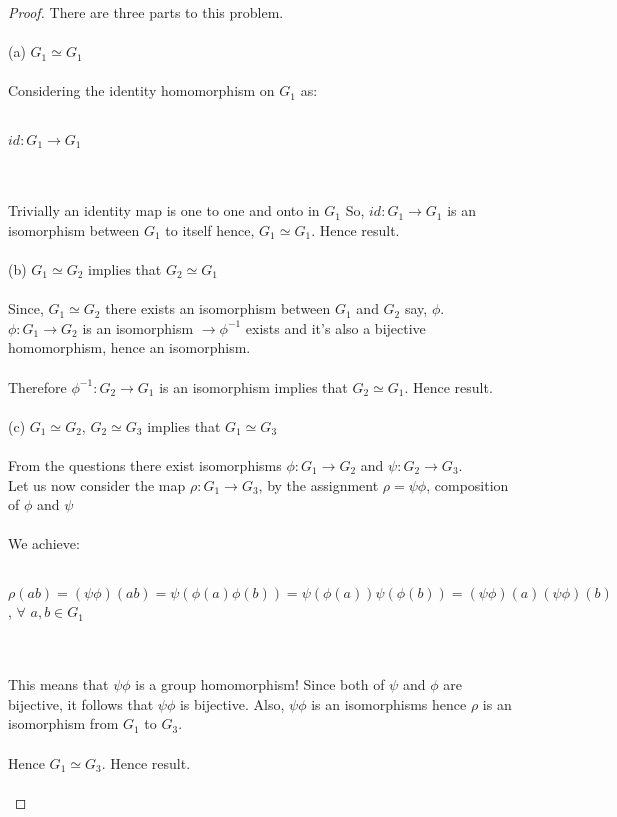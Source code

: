 \documentclass[12pt]{article}
\begin{document}
\begin{proof}
There are three parts to this problem. \\ \\
(a) $G_1 \simeq G_1$ \\ \\
Considering the identity homomorphism on $G_1$ as: \\ \\ 
\centerline{$id: G_1 \rightarrow G_1$} \\ \\ 
Trivially an identity map is one to one and onto in $G_1$ So, $id: G_1 \rightarrow G_1$ is an isomorphism between $G_1$ to itself hence, $G_1 \simeq G_1$. Hence result. \\ \\
(b) $G_1 \simeq G_2$ implies that $G_2 \simeq G_1$ \\ \\
Since, $G_1 \simeq G_2$ there exists an isomorphism between $G_1$ and $G_2$ say, $\phi$. \\ 
$\phi: G_1 \rightarrow G_2$ is an isomorphism $\rightarrow \phi^{-1}$ exists and it's also a bijective homomorphism, hence an isomorphism. \\ \\
Therefore $\phi^{-1}:G_2 \rightarrow G_1$ is an isomorphism implies that $G_2 \simeq G_1$. Hence result. \\ \\
(c) $G_1 \simeq G_2$, $G_2 \simeq G_3$ implies that $G_1 \simeq G_3$ \\ \\
From the questions there exist isomorphisms $\phi: G_1 \rightarrow G_2$ and $\psi: G_2 \rightarrow G_3$. \\ 
Let us now consider the map $\rho: G_1 \rightarrow G_3$, by the assignment $\rho = \psi \phi$, composition of $\phi$ and $\psi$ \\ \\
We achieve: \\ \\
\centerline{$\rho(ab)=(\psi \phi)(ab)=\psi(\phi(a)\phi(b)) = \psi(\phi(a))\psi(\phi(b))=(\psi \phi)(a)(\psi \phi)(b)$, $\forall$ $a,b \in G_1$} \\ \\
This means that $\psi \phi$ is a group homomorphism! Since both of $\psi$ and $\phi$ are bijective, it follows that $\psi \phi$ is bijective. Also, $\psi \phi$ is an isomorphisms hence $\rho$ is an isomorphism from $G_1$ to $G_3$. \\ \\
Hence $G_1 \simeq G_3$. Hence result. \\ \\

\end{proof}
\end{document}
